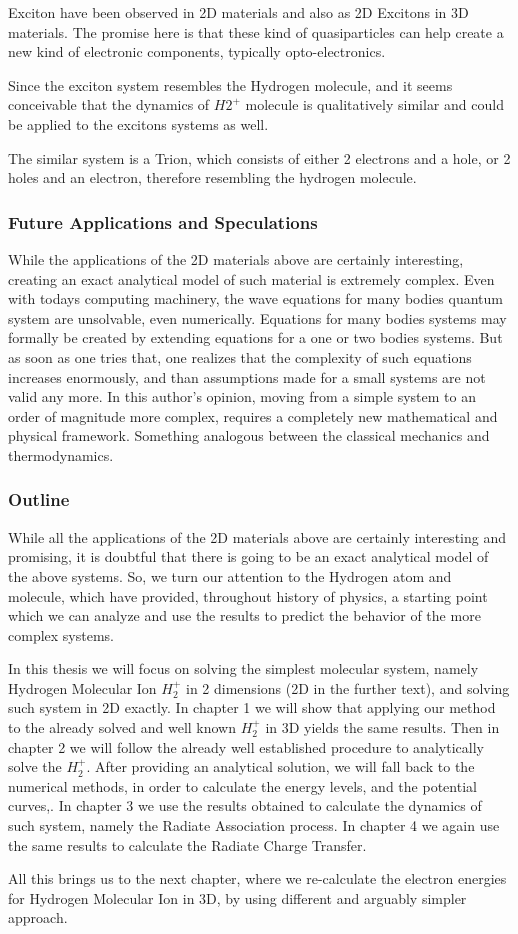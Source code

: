 Exciton have been observed in 2D materials \cite{Excitons2D1, Excitons2D2} and also as 2D Excitons in 3D materials. The promise here is that these kind of quasiparticles can help create a new kind of electronic components, typically opto-electronics.

Since the exciton system resembles the Hydrogen molecule, and it seems conceivable that the dynamics of  $ H2^{+} $ molecule is qualitatively similar and could be applied to the excitons systems as well.

The similar system is a Trion, which consists of either 2 electrons and a hole, or 2 holes and an electron, therefore resembling the hydrogen molecule.

\subsubsection{Future Applications and Speculations}

While the applications of the 2D materials above are certainly interesting, creating an exact analytical  model of such material is extremely complex. Even with todays computing machinery, the wave equations for many bodies quantum system are unsolvable, even numerically.  Equations for many bodies systems may formally be created by extending equations for a one or two bodies systems. But as soon as one tries that, one realizes that the complexity of such equations increases enormously, and than assumptions  made for a small systems are not valid any more. In this author's opinion, moving from a simple system to an order of magnitude more complex, requires a completely new mathematical and physical framework. Something analogous between the classical mechanics and thermodynamics.

\subsubsection{Outline}

While all the applications of the 2D materials above are certainly interesting and promising, it is doubtful that there is going to be an exact analytical model of the above systems. So, we turn our attention to the Hydrogen atom and molecule, which have provided, throughout history of physics, a starting point which we can analyze and use the results to predict the behavior of the more complex systems. 

In this thesis we will focus on solving the simplest molecular system, namely Hydrogen Molecular Ion $ {H_2^{+}}  $ in 2 dimensions (2D in the further text), and solving such system in 2D exactly.  In chapter 1 we will show that applying our method to the already solved and well known $ {H_2^{+}} $ in 3D yields the same results. Then in chapter 2 we will follow  the already well established procedure \cite{Bates1} to analytically solve the $ {H_2^{+}} $. After providing an analytical solution, we will fall back to the numerical methods, in order to calculate the energy levels, and the potential curves,. In chapter 3 we use the results obtained to calculate the dynamics of such system, namely the Radiate Association process. In chapter 4 we again use the same results to calculate the Radiate Charge Transfer. 

All this brings us to the next chapter, where we re-calculate the electron energies for Hydrogen Molecular Ion in 3D, by using different and arguably simpler approach.
